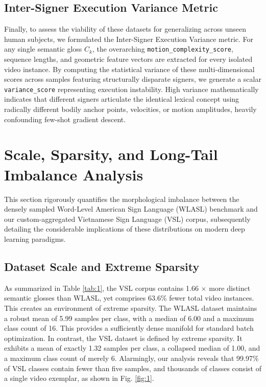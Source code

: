 \documentclass{ieeeaccess}
\begin{document}
\subsection{Inter-Signer Execution Variance Metric} 
Finally, to assess the viability of these datasets for generalizing across unseen human subjects, we formulated the Inter-Signer Execution Variance metric. For any single semantic gloss $C_k$, the overarching \texttt{motion\_complexity\_score}, sequence lengths, and geometric feature vectors are extracted for every isolated video instance. By computing the statistical variance of these multi-dimensional scores across samples featuring structurally disparate signers, we generate a scalar \texttt{variance\_score} representing execution instability. High variance mathematically indicates that different signers articulate the identical lexical concept using radically different bodily anchor points, velocities, or motion amplitudes, heavily confounding few-shot gradient descent.

\section{Scale, Sparsity, and Long-Tail Imbalance Analysis}
\label{sec:scale}

This section rigorously quantifies the morphological imbalance between the densely sampled Word-Level American Sign Language (WLASL) benchmark and our custom-aggregated Vietnamese Sign Language (VSL) corpus, subsequently detailing the considerable implications of these distributions on modern deep learning paradigms.

\subsection{Dataset Scale and Extreme Sparsity}
As summarized in Table \ref{tab:1}, the VSL corpus contains 1.66 $\times$ more distinct semantic glosses than WLASL, yet comprises 63.6\% fewer total video instances. This creates an environment of extreme sparsity. The WLASL dataset maintains a robust mean of 5.99 samples per class, with a median of 6.00 and a maximum class count of 16. This provides a sufficiently dense manifold for standard batch optimization. In contrast, the VSL dataset is defined by extreme sparsity. It exhibits a mean of exactly 1.32 samples per class, a collapsed median of 1.00, and a maximum class count of merely 6. Alarmingly, our analysis reveals that 99.97\% of VSL classes contain fewer than five samples, and thousands of classes consist of a single video exemplar, as shown in Fig. \ref{fig:1}.
\end{document}
